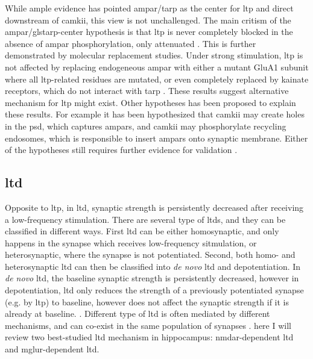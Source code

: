 While ample evidence has pointed \gls{ampar}/\gls{tarp} as the center for \gls{ltp} and direct downstream of \gls{camkii}, this view is not unchallenged. The main critism of the \gls{ampar}/gls{tarp}-center hypothesis is that \gls{ltp} is never completely blocked in the absence of \gls{ampar} phosphorylation, only attenuated \citep{herring16}. This is further demonstrated by molecular replacement studies. Under strong stimulation, \gls{ltp} is not affected by replacing endogeneous \gls{ampar} with either a mutant GluA1 subunit where all \gls{ltp}-related residues are mutated, or even completely replaced by kainate receptors, which do not interact with \gls{tarp} \citep{granger13, chen03}. These results suggest alternative mechanism for \gls{ltp} might exist. Other hypotheses has been proposed to explain these results. For example it has been hypothesized that \gls{camkii} may create holes in the \gls{psd}, which captures \glspl{ampar}, and \gls{camkii} may phosphorylate recycling endosomes, which is responsible to insert \glspl{ampar} onto synaptic membrane. Either of the hypotheses still requires further evidence for validation \citep{herring16}.

\subsection{\gls{ltd}}

Opposite to \gls{ltp}, in \gls{ltd}, synaptic strength is persistently decreased after receiving a low-frequency stimulation. There are several type of \glspl{ltd}, and they can be classified in different ways. First \gls{ltd} can be either homosynaptic, and only happens in the synapse which receives low-frequency sitmulation, or heterosynaptic, where the synapse is not potentiated. Second, both homo- and heterosynaptic \gls{ltd} can then be classified into \textit{de novo} \gls{ltd} and depotentiation. In \textit{de novo} \gls{ltd}, the baseline synaptic strength is persistently decreased, however in depotentiation, \gls{ltd} only reduces the strength of a previously potentiated synapse (e.g. by \gls{ltp}) to baseline, however does not affect the synaptic strength if it is already at baseline. \citep{collingridge10}. Different type of \gls{ltd} is often mediated by different mechanisms, and can co-exist in the same population of synapses \citep{collingridge10}. here I will review two best-studied \gls{ltd} mechanism in hippocampus: \gls{nmdar}-dependent \gls{ltd} and \gls{mglur}-dependent \gls{ltd}.


